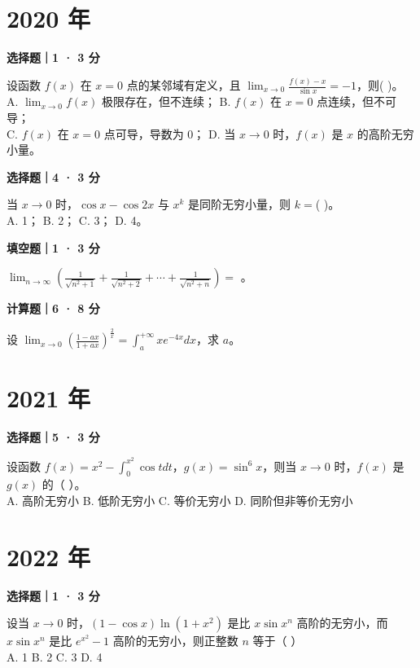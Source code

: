 

\section*{2020 年}


\textbf{选择题｜1 · 3 分}

设函数 $f(x)$ 在 $x = 0$ 点的某邻域有定义，且 $\lim_{x\to0} \frac{f(x)-x}{\sin x} = -1$，则( \quad )。\\
A. $\lim_{x\to0} f(x)$ 极限存在，但不连续； \quad B. $f(x)$ 在 $x = 0$ 点连续，但不可导；\\
C. $f(x)$ 在 $x = 0$ 点可导，导数为 0； \quad D. 当 $x \to 0$ 时，$f(x)$ 是 $x$ 的高阶无穷小量。


\textbf{选择题｜4 · 3 分}

当 $x \to 0$ 时，$\cos x - \cos 2x$ 与 $x^k$ 是同阶无穷小量，则 $k =$( \quad )。\\
A. 1； \quad B. 2； \quad C. 3； \quad D. 4。


\textbf{填空题｜1 · 3 分}

$\lim_{n\to\infty} \left( \frac{1}{\sqrt{n^2+1}} + \frac{1}{\sqrt{n^2+2}} + \cdots + \frac{1}{\sqrt{n^2+n}} \right) = $ \underline{\hspace{3cm}}。


\textbf{计算题｜6 · 8 分}

设 $\lim_{x\to 0} \left( \frac{1-ax}{1+ax} \right)^{\frac{2}{x}} = \int_a^{+\infty} xe^{-4x} dx$，求 $a$。



\section*{2021 年}


\textbf{选择题｜5 · 3 分}

设函数 $f(x) = x^2 - \int_0^{x^2} \cos t dt$，$g(x) = \sin^6 x$，则当 $x \to 0$ 时，$f(x)$ 是 $g(x)$ 的（ \quad ）。\\
A. 高阶无穷小 \quad B. 低阶无穷小 \quad C. 等价无穷小 \quad D. 同阶但非等价无穷小


\section*{2022 年}


\textbf{选择题｜1 · 3 分}

设当 $x \to 0$ 时，$(1-\cos x)\ln(1+x^2)$ 是比 $x\sin x^n$ 高阶的无穷小，而 $x\sin x^n$ 是比 $e^{x^2}-1$ 高阶的无穷小，则正整数 $n$ 等于（ \quad ）\\
A. 1 \quad B. 2 \quad C. 3 \quad D. 4


